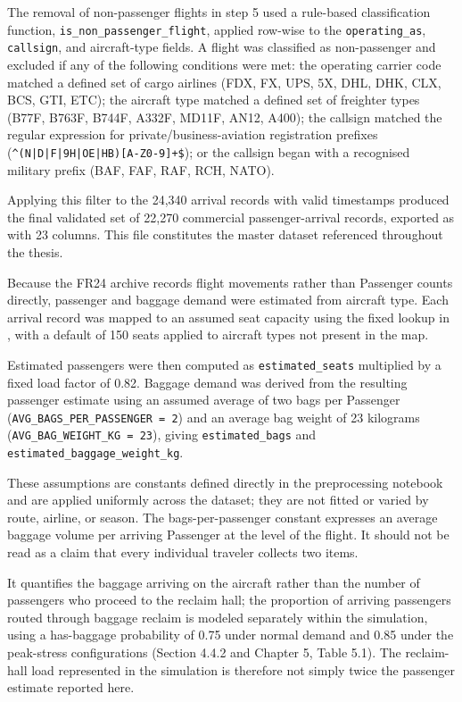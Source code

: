 The removal of non-passenger flights in step 5 used a rule-based classification function, \texttt{is\_non\_passenger\_flight}, applied row-wise to the \texttt{operating\_as}, \texttt{callsign}, and aircraft-type fields. A flight was classified as non-passenger and excluded if any of the following conditions were met: the operating carrier code matched a defined set of cargo airlines (FDX, FX, UPS, 5X, DHL, DHK, CLX, BCS, GTI, ETC); the aircraft type matched a defined set of freighter types (B77F, B763F, B744F, A332F, MD11F, AN12, A400); the callsign matched the regular expression for private/business-aviation registration prefixes (\verb!^(N|D|F|9H|OE|HB)[A-Z0-9]+$!); or the callsign began with a recognised military prefix (BAF, FAF, RAF, RCH, NATO).

Applying this filter to the 24,340 arrival records with valid timestamps produced the final validated set of 22,270 commercial passenger-arrival records, exported as  with 23 columns. This file constitutes the master dataset referenced throughout the thesis.

Because the FR24 archive records flight movements rather than Passenger counts directly, passenger and baggage demand were estimated from aircraft type. Each arrival record was mapped to an assumed seat capacity using the fixed lookup in , with a default of 150 seats applied to aircraft types not present in the map.

Estimated passengers were then computed as \texttt{estimated\_seats} multiplied by a fixed load factor of 0.82. Baggage demand was derived from the resulting passenger estimate using an assumed average of two bags per Passenger (\texttt{AVG\_BAGS\_PER\_PASSENGER = 2}) and an average bag weight of 23 kilograms (\texttt{AVG\_BAG\_WEIGHT\_KG = 23}), giving \texttt{estimated\_bags} and \texttt{estimated\_baggage\_weight\_kg}.

These assumptions are constants defined directly in the preprocessing notebook and are applied uniformly across the dataset; they are not fitted or varied by route, airline, or season. The bags-per-passenger constant expresses an average baggage volume per arriving Passenger at the level of the flight. It should not be read as a claim that every individual traveler collects two items.

It quantifies the baggage arriving on the aircraft rather than the number of passengers who proceed to the reclaim hall; the proportion of arriving passengers routed through baggage reclaim is modeled separately within the simulation, using a has-baggage probability of 0.75 under normal demand and 0.85 under the peak-stress configurations (Section 4.4.2 and Chapter 5, Table 5.1). The reclaim-hall load represented in the simulation is therefore not simply twice the passenger estimate reported here.

